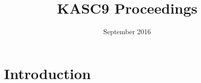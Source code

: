 \documentclass{article}
\title{KASC9 Proceedings}
\author{ }
\date{September 2016}
\begin{document}
\maketitle

\section{Introduction}
\end{document}

